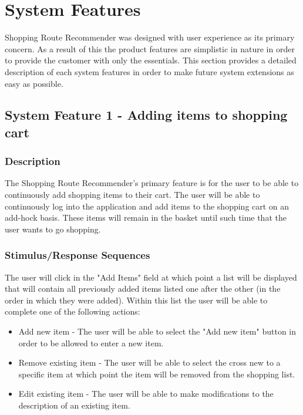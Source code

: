 \documentclass[10pt, a4paper, twocolumn]{scrartcl}
\begin{document}
	\section{System Features}
	
		Shopping Route Recommender was designed with user experience as its primary concern. As a result of this the product features are simplistic in nature in order to provide the customer with only the essentials.	This section provides a detailed description of each system features in order to make future system extensions as easy as possible. 
	
		\subsection{System Feature 1 - Adding items to shopping cart}
		\label{featureadd}
	
			\subsubsection{Description}
			
				The Shopping Route Recommender's primary feature is for the user to be able to continuously add shopping items to their cart. The user will be able to continuously log into the application and add items to the shopping cart on an add-hock basis. These items will remain in the basket until such time that the user wants to go shopping. 
			
			\subsubsection{Stimulus/Response Sequences}
			
				The user will click in the "Add Items" field at which point a list will be displayed that will contain all previously added items listed one after the other (in the order in which they were added). Within this list the user will be able to complete one of the following actions:
			
				\begin{itemize}
					\item Add new item - The user will be able to select the "Add new item" button in order to be allowed to enter a new item. 
					\item Remove existing item - The user will be able to select the cross new to a specific item at which point the item will be removed from the shopping list.
					\item Edit existing item - The user will be able to make modifications to the description of an existing item.
				\end{itemize}
			
\end{document}

